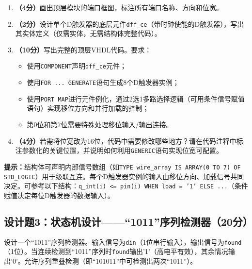 \begin{enumerate}[label=(\arabic*)]
  \item \textbf{（4分）}画出顶层模块的端口框图，标注所有端口名称、方向和位宽。
  \item \textbf{（2分）}设计单个D触发器的底层元件\texttt{dff\_ce}（带时钟使能的D触发器），写出其实体定义（仅需实体，无需结构体完整代码）。
  \item \textbf{（10分）}写出完整的顶层VHDL代码。要求：
  \begin{itemize}
    \item 使用\texttt{COMPONENT}声明\texttt{dff\_ce}元件；
    \item 使用\texttt{FOR ... GENERATE}语句生成8个D触发器实例；
    \item 使用\texttt{PORT MAP}进行元件例化，通过2选1多路选择逻辑（可用条件信号赋值语句）实现移位方向和并行加载的控制；
    \item 第0位和第7位需要特殊处理移位输入/输出连接。
  \end{itemize}
  \item \textbf{（4分）}若需将位宽改为16位，代码中需要修改哪些地方？请在代码注释中标注参数化的关键位置，并说明如何利用\texttt{GENERIC}语句实现位宽可配置。
\end{enumerate}

\begin{framed}
\textbf{提示：}结构体可声明内部信号数组（如\texttt{TYPE wire\_array IS ARRAY(0 TO 7) OF STD\_LOGIC}）用于级联互连。每个D触发器实例的输入由移位方向、加载信号共同决定。可参考以下结构：\texttt{q\_int(i) <= pin(i) WHEN load = '1' ELSE ...}（条件赋值决定每位D触发器的数据输入）。
\end{framed}

\subsection*{设计题3：状态机设计——``1011''序列检测器（20分）}

设计一个``1011''序列检测器。输入信号为\texttt{din}（1位串行输入），输出信号为\texttt{found}（1位）。当连续检测到``1011''序列时\texttt{found}输出'1'（高电平有效），其余情况输出'0'。允许序列重叠检测（即``101011''中可检测出两次``1011''）。

